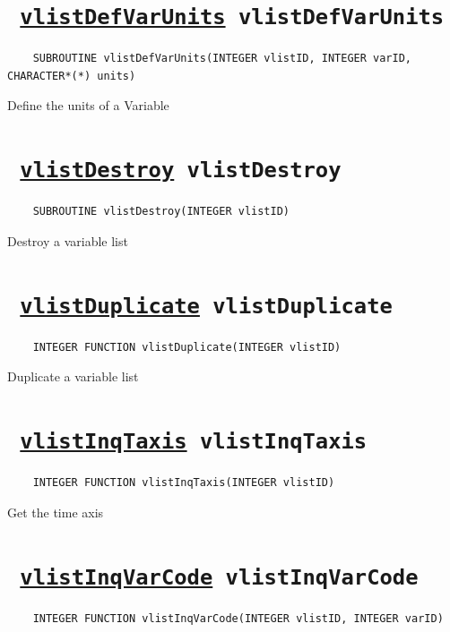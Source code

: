 \section*{\texttt{ 
\ifpdf
\hyperref[vlistDefVarUnits]{vlistDefVarUnits}
\else
vlistDefVarUnits
\fi
}}
\begin{verbatim}
    SUBROUTINE vlistDefVarUnits(INTEGER vlistID, INTEGER varID, CHARACTER*(*) units)
\end{verbatim}

Define the units of a Variable
\ifpdfoutput{}{(\ref{vlistDefVarUnits})}


\section*{\texttt{ 
\ifpdf
\hyperref[vlistDestroy]{vlistDestroy}
\else
vlistDestroy
\fi
}}
\begin{verbatim}
    SUBROUTINE vlistDestroy(INTEGER vlistID)
\end{verbatim}

Destroy a variable list
\ifpdfoutput{}{(\ref{vlistDestroy})}


\section*{\texttt{ 
\ifpdf
\hyperref[vlistDuplicate]{vlistDuplicate}
\else
vlistDuplicate
\fi
}}
\begin{verbatim}
    INTEGER FUNCTION vlistDuplicate(INTEGER vlistID)
\end{verbatim}

Duplicate a variable list
\ifpdfoutput{}{(\ref{vlistDuplicate})}


\section*{\texttt{ 
\ifpdf
\hyperref[vlistInqTaxis]{vlistInqTaxis}
\else
vlistInqTaxis
\fi
}}
\begin{verbatim}
    INTEGER FUNCTION vlistInqTaxis(INTEGER vlistID)
\end{verbatim}

Get the time axis
\ifpdfoutput{}{(\ref{vlistInqTaxis})}


\section*{\texttt{ 
\ifpdf
\hyperref[vlistInqVarCode]{vlistInqVarCode}
\else
vlistInqVarCode
\fi
}}
\begin{verbatim}
    INTEGER FUNCTION vlistInqVarCode(INTEGER vlistID, INTEGER varID)
\end{verbatim}

